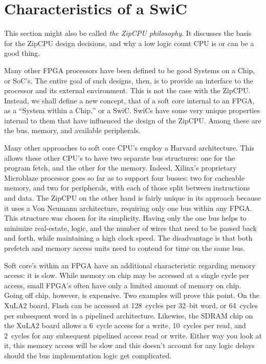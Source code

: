 \documentclass{gqtekspec}
\begin{document}
\section{Characteristics of a SwiC}

This section might also be called {\em the ZipCPU philosophy}.  It discusses
the basis for the ZipCPU design decisions, and why a low logic count CPU
is or can be a good thing.

Many other FPGA processors have been defined to be good Systems on a Chip, or 
SoC's.  The entire goal of such designs, then, is to provide an interface
to the processor and its external environment.  This is not the case with the
ZipCPU.  Instead, we shall define a new concept, that of a soft core internal to
an FPGA, as a ``System within a Chip,'' or a SwiC.  SwiCs have some very
unique properties internal to them that have influenced the design of the
ZipCPU.  Among these are the bus, memory, and available peripherals.

Many other approaches to soft core CPU's employ a Harvard architecture. 
This allows these other CPU's to have two separate bus structures: one for the
program fetch, and the other for the memory.  Indeed, Xilinx's proprietary
Microblaze processor
goes so far as to support four busses: two for cacheable memory, and two for
peripherals, with each of those split between instructions and data.  The
ZipCPU on the other hand is fairly unique in its approach because it uses a
Von Neumann architecture, requiring only one bus within any FPGA.  This
structure was chosen for its simplicity.  Having only the one bus helps to
minimize real-estate, logic, and the number of wires that need to be passed
back and forth, while maintaining a high clock speed.  The disadvantage is
that both prefetch and memory access units need to contend for time on the 
same bus.

Soft core's within an FPGA have an additional characteristic regarding
memory access: it is slow.  While memory on chip may be accessed at a single
cycle per access, small FPGA's often have only a limited amount of memory on
chip.  Going off chip, however, is expensive.  Two examples will prove this
point.  On
the XuLA2 board, Flash can be accessed at 128~cycles per 32--bit word,
or 64~cycles per subsequent word in a pipelined architecture.  Likewise, the
SDRAM chip on the XuLA2 board allows a 6~cycle access for a write, 10~cycles
per read, and 2~cycles for any subsequent pipelined access read or write.
Either way you look at it, this memory access will be slow and this doesn't
account for any logic delays should the bus implementation logic get
complicated.
\end{document}
